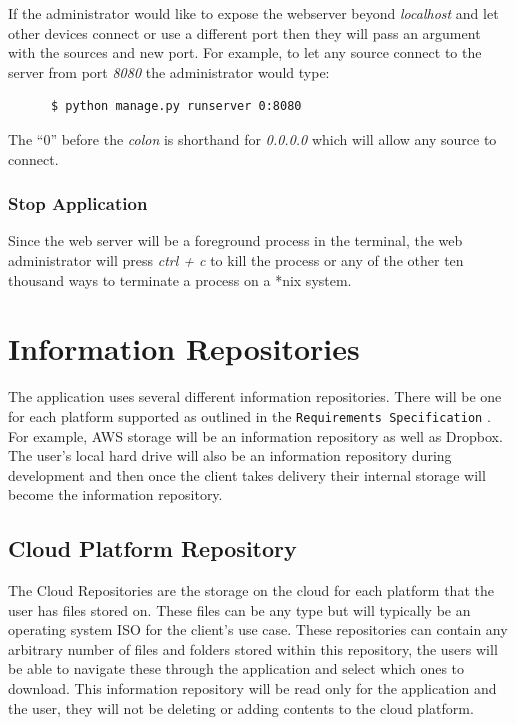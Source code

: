 \documentclass{article}
\begin{document}
      If the administrator would like to expose the webserver beyond \textit{localhost} and let other devices connect or
      use a different port then they will pass an argument with the sources and new port. For example, to let any source
      connect to the server from port \textit{8080} the administrator would type:
      \begin{verbatim}
      $ python manage.py runserver 0:8080
      \end{verbatim}
      The ``0'' before the \textit{colon} is shorthand for \textit{0.0.0.0} which will allow any source to connect.

      \subsubsection{Stop Application}
      Since the web server will be a foreground process in the terminal, the web administrator will press \textit{ctrl + c}
      to kill the process or any of the other ten thousand ways to terminate a process on a *nix system.

\section{Information Repositories}
The application uses several different information repositories. There will be one for each platform supported as
outlined in the \texttt{Requirements Specification} \cite{reqs}. For example, AWS storage will be an information
repository as well as Dropbox. The user's local hard drive will also be an information repository during
development and then once the client takes delivery their internal storage will become the information repository.

    \subsection{Cloud Platform Repository}
    The Cloud Repositories are the storage on the cloud for each platform that the user has files stored on.
    These files can be any type but will typically be an operating system ISO for the client's use case. These
    repositories can contain any arbitrary number of files and folders stored within this repository, the users
    will be able to navigate these through the application and select which ones to download. This information repository
    will be read only for the application and the user, they will not be deleting or adding contents to the cloud platform.
    
\end{document}
